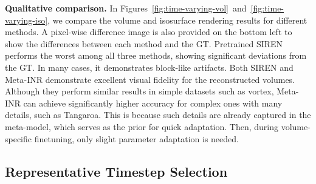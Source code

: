 {\bf Qualitative comparison.} 
In Figures~\ref{fig:time-varying-vol}~and~\ref{fig:time-varying-iso}, we compare the volume and isosurface rendering results for different methods. 
A pixel-wise difference image is also provided on the bottom left to show the differences between each method and the GT.
Pretrained SIREN performs the worst among all three methods, showing significant deviations from the GT. In many cases, it demonstrates block-like artifacts. 
%
Both SIREN and Meta-INR demonstrate excellent visual fidelity for the reconstructed volumes. Although they perform similar results in simple datasets such as vortex, Meta-INR can achieve significantly higher accuracy for complex ones with many details, such as Tangaroa. This is because such details are already captured in the meta-model, which serves as the prior for quick adaptation. Then, during volume-specific finetuning, only slight parameter adaptation is needed.

\vspace{-0.05in}
\subsection{Representative Timestep Selection}

